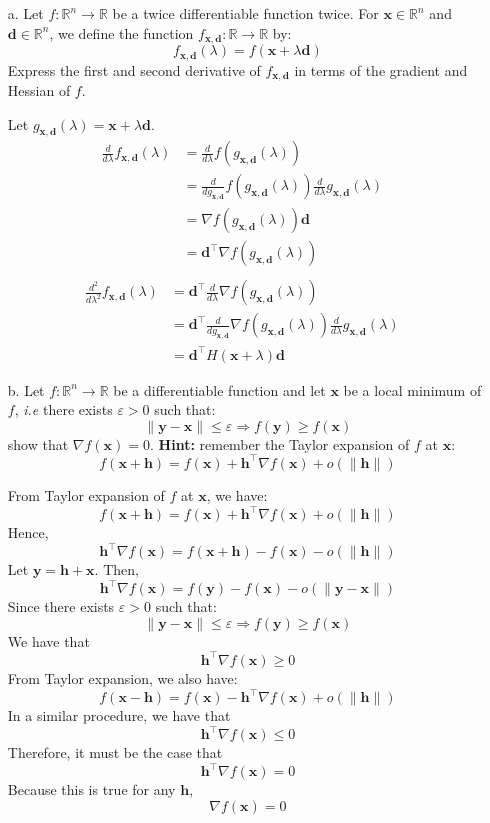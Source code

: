 \documentclass[11pt]{article}
\newcommand{\eps}{\varepsilon}
\newcommand{\R}{\mathbb{R}}                     %
\newcommand{\bx}{\mathbf{x}}
\newcommand{\bd}{\mathbf{d}}
\newcommand{\by}{\mathbf{y}}
\newcommand{\bh}{\mathbf{h}}
\begin{document}
\begin{itemize}
    \item[a.] Let $f:\R^n\to\R$ be a twice differentiable function twice. For
$\bx\in\R^n$ and $\bd\in\R^n$, we define the function $f_{\bx, \bd}:\R\to\R$ by:
\begin{displaymath}
    f_{\bx,\bd}(\lambda) = f(\bx+\lambda \bd)
\end{displaymath}
Express the first and second derivative of $f_{\bx,\bd}$ in terms of the
gradient and Hessian of $f$. 

\color{blue}
Let $g_{\bx,\bd}(\lambda) = \bx + \lambda \bd$.
\begin{align*}
\frac{d}{d\lambda}f_{\bx,\bd}(\lambda) &= \frac{d}{d\lambda}f(g_{\bx,\bd}(\lambda)) &\\
&=\frac{d}{dg_{\bx,\bd}}f(g_{\bx,\bd}(\lambda)) \frac{d}{d\lambda}g_{\bx,\bd}(\lambda) &\\
&= \nabla f(g_{\bx,\bd}(\lambda)) \bd &\\
&=\bd^\intercal  \nabla f(g_{\bx,\bd}(\lambda)) &\\
\end{align*}
\begin{align*}
\frac{d^2}{d\lambda^2} f_{\bx,\bd}(\lambda) &= \bd^\intercal  \frac{d}{d\lambda}  \nabla f(g_{\bx,\bd}(\lambda)) &\\
&= \bd^\intercal  \frac{d}{dg_{\bx,\bd}} \nabla f(g_{\bx,\bd}(\lambda)) \frac{d}{d\lambda} g_{\bx,\bd}(\lambda) &\\
&= \bd^\intercal  H(\bx+\lambda) \bd
\end{align*}
\color{black}


\item[b.] Let $f:\R^n\to\R$ be a differentiable function and let $\bx$ be
a local minimum of $f$, \emph{i.e} there exists $\eps>0$ such that:
\begin{displaymath}
    \|\by-\bx\| \leq \eps \Rightarrow f(\by) \geq f(\bx)
\end{displaymath}
show that $\nabla f(\bx) = 0$. \textbf{Hint:} remember the Taylor expansion of
$f$ at $\bx$:
\begin{displaymath}
    f(\bx+\bh) = f(\bx) + \bh^\intercal\nabla f(\bx) + o(\|\bh\|)
\end{displaymath}

\color{blue}
From Taylor expansion of $f$ at $\bx$, we have:
$$f(\bx+\bh) = f(\bx) + \bh^\intercal\nabla f(\bx) + o(\|\bh\|)$$
Hence,
$$\bh^\intercal\nabla f(\bx) = f(\bx+\bh) - f(\bx) - o(\|\bh\|)$$
Let $\by=\bh+\bx$. Then,
$$\bh^\intercal\nabla f(\bx) = f(\by) - f(\bx) - o(\|\by-\bx\|)$$
Since there exists $\eps>0$ such that:
\begin{displaymath}
    \|\by-\bx\| \leq \eps \Rightarrow f(\by) \geq f(\bx)
\end{displaymath}
We have that 
$$\bh^\intercal\nabla f(\bx) \geq 0$$
From Taylor expansion, we also have:
$$f(\bx-\bh) = f(\bx) - \bh^\intercal\nabla f(\bx) + o(\|\bh\|)$$
In a similar procedure, we have that 
$$\bh^\intercal\nabla f(\bx) \leq 0$$
Therefore, it must be the case that 
$$\bh^\intercal\nabla f(\bx) = 0$$
Because this is true for any $\bh$, 
$$\nabla f(\bx) = 0$$
\color{black}



\end{itemize}
\end{document}

